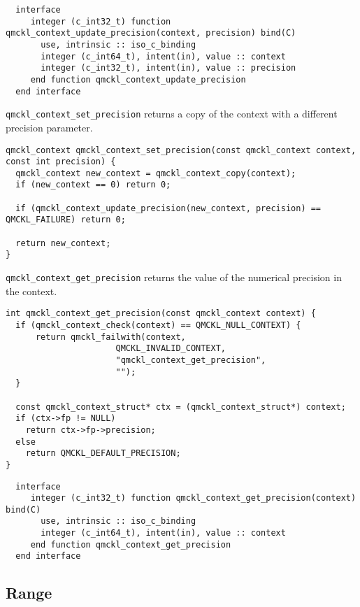 \begin{verbatim}
  interface
     integer (c_int32_t) function qmckl_context_update_precision(context, precision) bind(C)
       use, intrinsic :: iso_c_binding
       integer (c_int64_t), intent(in), value :: context
       integer (c_int32_t), intent(in), value :: precision
     end function qmckl_context_update_precision
  end interface
\end{verbatim}

\texttt{qmckl\_context\_set\_precision} returns a copy of the context with a
different precision parameter.

\begin{verbatim}
qmckl_context qmckl_context_set_precision(const qmckl_context context, const int precision) {
  qmckl_context new_context = qmckl_context_copy(context);
  if (new_context == 0) return 0;

  if (qmckl_context_update_precision(new_context, precision) == QMCKL_FAILURE) return 0;

  return new_context;
}
\end{verbatim}

\texttt{qmckl\_context\_get\_precision} returns the value of the numerical precision in the context.

\begin{verbatim}
int qmckl_context_get_precision(const qmckl_context context) {
  if (qmckl_context_check(context) == QMCKL_NULL_CONTEXT) {
      return qmckl_failwith(context,
                      QMCKL_INVALID_CONTEXT,
                      "qmckl_context_get_precision",
                      "");
  }

  const qmckl_context_struct* ctx = (qmckl_context_struct*) context;
  if (ctx->fp != NULL) 
    return ctx->fp->precision;
  else
    return QMCKL_DEFAULT_PRECISION;
}
\end{verbatim}

\begin{verbatim}
  interface
     integer (c_int32_t) function qmckl_context_get_precision(context) bind(C)
       use, intrinsic :: iso_c_binding
       integer (c_int64_t), intent(in), value :: context
     end function qmckl_context_get_precision
  end interface
\end{verbatim}

\subsection{Range}
\label{sec:org014eb35}

